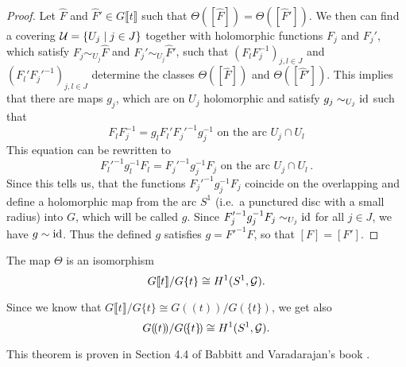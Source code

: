 \begin{proof}
  Let $\hat F$ and $\hat F'\in G\llbracket t\rrbracket$ such that
  $\Theta([\hat F])=\Theta([\hat F'])$.
  We then can find a covering $\mathcal{U}=\{U_j\mid j\in J\}$ together with
  holomorphic functions $F_j$ and $F_j'$, which satisfy
  $F_j\sim_{U_j}\hat F$ and $F_j'\sim_{U_j}\hat F'$, such that
  $(F_lF_j^{-1})_{j,l\in J}$ and $(F_l'F_j'^{-1})_{j,l\in J}$ determine the
  classes $\Theta([\hat F])$ and $\Theta([\hat F'])$.
  This implies that there are maps $g_j$, which are on $U_j$ holomorphic and
  satisfy $g_j\sim_{U_j}\operatorname{id}$ such that
  \[
    F_lF_j^{-1}=g_lF_l'F_j'^{-1}g_j^{-1}
    \text{~on~the~arc~} U_j\cap U_l
  \]
  This equation can be rewritten to
  \[
    F_l'^{-1}g_l^{-1}F_l=F_j'^{-1}g_j^{-1}F_j
    \text{~on~the~arc~} U_j\cap U_l \,.
  \]
  Since this tells us, that the functions $F_j'^{-1}g_j^{-1}F_j$ coincide on
  the overlapping and define a holomorphic map from the arc $S^1$ (i.e.\ a
  punctured disc with a small radius) into $G$, which will be called $g$.
  Since $F_j'^{-1}g_j^{-1}F_j\sim_{U_j}\operatorname{id}$ for all $j\in J$, we have
  $g\sim\operatorname{id}$.
  Thus the defined $g$ satisfies $g=F'^{-1}F$, so that $[F]=[F']$.
\end{proof}
\begin{thm}\label{thm:thm1helpMalgSibuy}
  The map $\Theta$ is an isomorphism
  \[
    G\llbracket t\rrbracket/G\{t\}\cong H^1(S^1,\mathcal{G}).
  \]
  \begin{s-rem}
    Since we know that
    $G\llbracket t\rrbracket/G\{t\}\cong G(\!(t)\!)/G(\!\{t\}\!)$\TODO[(cf~??)],
    we get also
    \[
      G(\!(t)\!)/G(\!\{t\}\!)\cong H^1(S^1,\mathcal{G}).
    \]
  \end{s-rem}
\end{thm}
This theorem is proven in Section 4.4 of Babbitt and Varadarajan's book
\cite{babbitt1989local}.

